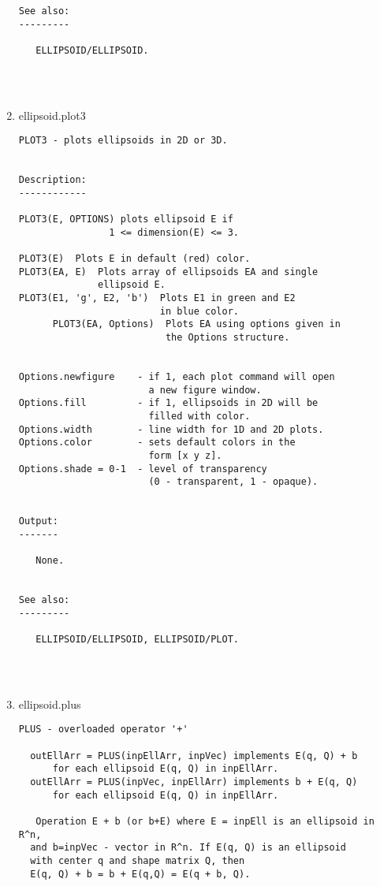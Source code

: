 \begin{enumerate}
\begin{lstlisting}
See also:
---------

   ELLIPSOID/ELLIPSOID.




\end{lstlisting}
\fontfamily{\familydefault}
\selectfont
\item {ellipsoid.plot3}
\selectfont
\begin{lstlisting}
PLOT3 - plots ellipsoids in 2D or 3D.


Description:
------------

PLOT3(E, OPTIONS) plots ellipsoid E if
                1 <= dimension(E) <= 3.

PLOT3(E)  Plots E in default (red) color.
PLOT3(EA, E)  Plots array of ellipsoids EA and single
              ellipsoid E.
PLOT3(E1, 'g', E2, 'b')  Plots E1 in green and E2
                         in blue color.
      PLOT3(EA, Options)  Plots EA using options given in
                          the Options structure.


Options.newfigure    - if 1, each plot command will open
                       a new figure window.
Options.fill         - if 1, ellipsoids in 2D will be
                       filled with color.
Options.width        - line width for 1D and 2D plots.
Options.color        - sets default colors in the
                       form [x y z].
Options.shade = 0-1  - level of transparency
                       (0 - transparent, 1 - opaque).


Output:
-------

   None.


See also:
---------

   ELLIPSOID/ELLIPSOID, ELLIPSOID/PLOT.




\end{lstlisting}
\fontfamily{\familydefault}
\selectfont
\item {ellipsoid.plus}
\selectfont
\begin{lstlisting}
PLUS - overloaded operator '+'

  outEllArr = PLUS(inpEllArr, inpVec) implements E(q, Q) + b
      for each ellipsoid E(q, Q) in inpEllArr.
  outEllArr = PLUS(inpVec, inpEllArr) implements b + E(q, Q)
      for each ellipsoid E(q, Q) in inpEllArr.

   Operation E + b (or b+E) where E = inpEll is an ellipsoid in R^n,
  and b=inpVec - vector in R^n. If E(q, Q) is an ellipsoid
  with center q and shape matrix Q, then
  E(q, Q) + b = b + E(q,Q) = E(q + b, Q).


\end{lstlisting}
\end{enumerate}

